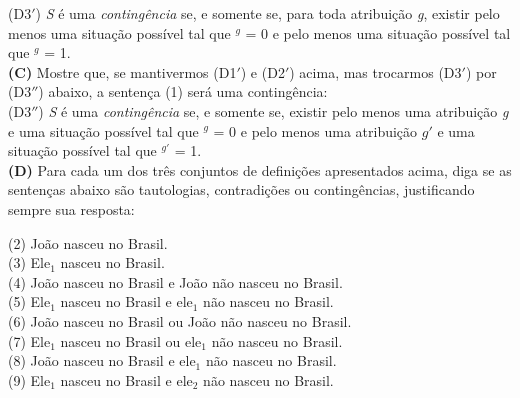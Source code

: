 \begin{tcolorbox}[parbox=false,boxrule=0pt,sharp corners,breakable]
\vspace*{-1mm}
\n (D3$'$) \textit{S} é uma \textit{contingência} se, e somente
se, para toda atribuição \textit{g}, existir pelo menos uma
situação possível tal que $^{g}$ = 0 e pelo menos uma
situação possível tal que $^{g}$ = 1.\\


\n \textbf{(C)} Mostre que, se mantivermos (D1$'$) e (D2$'$) acima,
mas trocarmos (D3$'$) por (D3$''$) abaixo, a sentença (1) será uma
contingência:\\
\vspace*{-1mm}
\n (D3$''$) \textit{S} é uma \textit{contingência} se, e somente
se, existir pelo menos uma atribuição \textit{g} e uma situação
possível tal que $^{g}$ = 0 e pelo menos uma atribuição
$g\prime$ e uma situação possível tal que $^{g'}$ = 1.\\

\largerpage[2]
\n \textbf{(D)} Para cada um dos três conjuntos de definições
apresentados acima, diga se as sentenças abaixo são tautologias,
contradições ou contingências, justificando sempre sua resposta:\vspace*{-2mm}
\pagebreak 

(2) João nasceu no Brasil.\\

(3) Ele$_{1}$ nasceu no Brasil.\\

(4) João nasceu no Brasil e João não nasceu no Brasil.\\

(5) Ele$_{1}$ nasceu no Brasil e ele$_{1}$ não nasceu no Brasil.\\

(6) João nasceu no Brasil ou João não nasceu no Brasil.\\

(7) Ele$_{1}$ nasceu no Brasil ou ele$_{1}$ não nasceu no Brasil.\\

(8) João nasceu no Brasil e ele$_{1}$ não nasceu no Brasil.\\

(9) Ele$_{1}$ nasceu no Brasil e ele$_{2}$ não nasceu no Brasil.\\


\end{tcolorbox}




